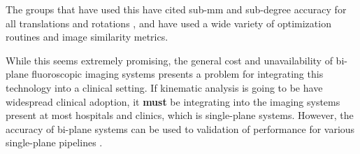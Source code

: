 The groups that have used this have cited sub-mm and sub-degree accuracy for all translations and rotations \cite{burtonAutomaticTrackingHealthy2021,youVivoMeasurement3D2001,bakaStatisticalShapeModelBased2012}, and have used a wide variety of optimization routines and image similarity metrics. 

While this seems extremely promising, the general cost and unavailability of bi-plane fluoroscopic imaging systems presents a problem for integrating this technology into a clinical setting. If kinematic analysis is going to be have widespread clinical adoption, it \textbf{must} be integrating into the imaging systems present at most hospitals and clinics, which is single-plane systems. However, the accuracy of bi-plane systems can be used to validation of performance for various single-plane pipelines \cite{brobergValidationMachineLearning2023}.
